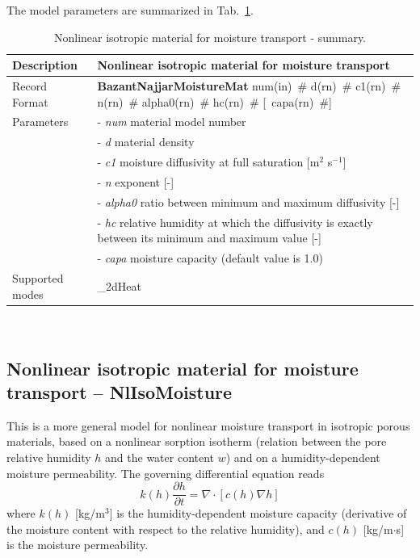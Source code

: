 \documentclass[a4paper]{article}
\newcommand{\descitem}[1]{{\noindent \bf #1}}
\newcommand{\elemparam}[2]{{{#1\tiny (#2)}~\#}}
\newcommand{\optelemparam}[2]{[{~\elemparam{#1}{#2}}]}
\newcommand{\param}[1]{{\it #1}}
\newenvironment{mmt}{\begin{tabular}{|l|p{9cm}|}}{\end{tabular}\\}
\newenvironment{mmt}{\begin{tabular}{|l|l|}}{\end{tabular}\\}
\begin{document}
The model parameters are summarized in Tab.~\ref{BazantNajjarMoistureMat}.
\begin{table}[!htb]
\begin{mmt}
\hline
Description & Nonlinear isotropic material for moisture transport\\
\hline
Record Format & \descitem{BazantNajjarMoistureMat} \elemparam{num}{in}
\elemparam{d}{rn} \elemparam{c1}{rn} \elemparam{n}{rn}
\elemparam{alpha0}{rn} \elemparam{hc}{rn} \optelemparam{capa}{rn}\\
Parameters &- \param{num} material model number\\
&- \param{d} material density\\
&- \param{c1} moisture diffusivity at full saturation [m$^2$ s$^{-1}$]\\
&- \param{n} exponent [-]\\
&- \param{alpha0} ratio between minimum and maximum diffusivity [-]\\
&- \param{hc} relative humidity at which the diffusivity is exactly
between its minimum and maximum value [-] \\
&- \param{capa} moisture capacity (default value is 1.0)\\

Supported modes& \_2dHeat\\
\hline
\end{mmt}
\caption{Nonlinear isotropic material for moisture transport - summary.}
\label{BazantNajjarMoistureMat}
\end{table}



\subsection{Nonlinear isotropic material for moisture transport -- NlIsoMoisture}
\label{sec:NlIsoMoistureMat}
This is a more general model for nonlinear moisture transport in isotropic 
porous
materials, based on a nonlinear sorption isotherm (relation between 
the pore relative humidity $h$ and the water content $w$) 
and on a humidity-dependent
moisture permeability.
The governing differential equation reads
\begin{equation}\label{nlisomoisture:governing}
k(h) \frac{\partial h}{\partial t} = \nabla \cdot \left[ c(h) \nabla h \right]
\end{equation} 
where 
$k(h)$ [kg/m$^3$] is the humidity-dependent moisture capacity (derivative of
the moisture content with respect to the relative humidity), and $c(h)$
[kg/m$\cdot$s] is the moisture permeability. 
\end{document}

